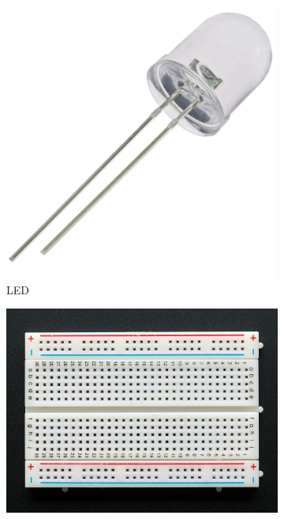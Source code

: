 \documentclass[a4paper,12pt]{report}
\begin{document}
    \begin{figure}[h!]
        \centering
        \begin{subfigure}[b]{0.4\linewidth}
            \includegraphics[width=\linewidth]{images/led.png}
            \caption{LED}
        \end{subfigure}
        \begin{subfigure}[b]{0.4\linewidth}
            \includegraphics[width=\linewidth]{images/probapanel.jpg}

\end{subfigure}
\end{figure}
\end{document}
